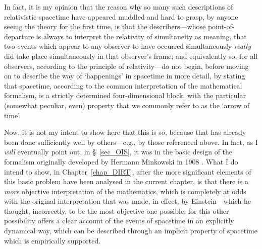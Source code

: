 In fact, it is my opinion that the reason why so many such descriptions of relativistic spacetime have appeared muddled and hard to grasp, by anyone seeing the theory for the first time, is that the describers---whose point-of-departure is always to interpret the relativity of simultaneity as meaning, that two events which appear to any observer to have occurred simultaneously \textit{really} did take place simultaneously in that observer's frame; and equivalently so, for all observers, according to the principle of relativity---do not begin, before moving on to describe the way of `happenings' in spacetime in more detail, by stating that spacetime, according to the common interpretation of the mathematical formalism, is a strictly determined four-dimensional block, with the particular (somewhat peculiar, even) property that we commonly refer to as the `arrow of time'.

Now, it is not my intent to show here that this is so, because that has already been done sufficiently well by others---e.g., by those referenced above. In fact, as I \textit{will} eventually point out, in \S~\ref{sec_OIS}, it was in the basic design of the formalism originally developed by Hermann Minkowski in 1908 \cite{Einstein1952}. What I do intend to show, in Chapter~\ref{chap_DIRT}, after the more significant elements of this basic problem have been analysed in the current chapter, is that there is a \textit{more} objective interpretation of the mathematics, which is completely at odds with the original interpretation that was made, in effect, by Einstein---which he thought, incorrectly, to be the most objective one possible; for this other possibility offers a clear account of the events of spacetime in an explicitly dynamical way, which can be described through an implicit property of spacetime which is empirically supported.

